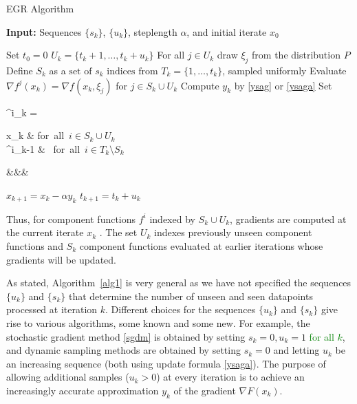 \documentclass[11pt]{article}
\begin{document}
\begin{algorithm}
	[H] 
	\caption{EGR Algorithm}
	\label{alg1}
	{\bf Input:} Sequences $\{ s_k\}$, $\{ u_k \}$, steplength $ \alpha $, and initial iterate $x_0$
	\begin{algorithmic}
		[1] 
		\State Set $t_{0} = 0$
		\State $U_k =\{t_{k}+1,\ldots, t_{k}+u_k \}$ 
		\State For  all $j \in U_k$ draw $\xi_j$ from the distribution $P$ 
		\State Define $S_k$ as a $ \mbox{set of } s_k \mbox{ indices from } T_k= \{ 1, \ldots ,t_{k}\}$, sampled uniformly
           \State Evaluate $\nabla f^j(x_k) = \nabla f(x_k, \xi_j) $ for $j \in S_k \cup U_k$
           \State Compute $y_k$ by \eqref{ysag} or \eqref{ysaga}
		\State Set \begin{flalign}  \label{chico} \qquad\quad \phi^i_k =
		\begin{cases} 
  x_k & \mbox{for all $i \in S_k\cup U_k$ } \\
  \phi^i_{k-1} & {\color{blue} \mbox{ for all $i \in T_k\setminus S_k$}}
 \end{cases}&&&
\end{flalign}
		\State $x_{k+1} = x_k - \alpha y_k$ 
		\State $ t_{k+1} = t_{k} +u_k $ 
		\EndLoop 
	\end{algorithmic}
\end{algorithm}

{\color{blue} Thus, for  component functions $f^i$ indexed by $S_k \cup U_k$,  gradients are computed at the current iterate $x_k$ . The set $U_k$ indexes previously unseen component functions and $S_k$  component functions evaluated at earlier iterations whose gradients will be updated.}

As stated, Algorithm~\ref{alg1} is very general as we have not specified the sequences $\{ u_k \}$ and $\{ s_k \}$ that determine the number of unseen and seen datapoints processed at iteration $k$. Different choices for the sequences $\{ u_k \}$ and $\{ s_k \}$ give rise to various algorithms, some known and some new. For example, the stochastic gradient method \eqref{sgdm} is obtained by setting $s_k=0, u_k =1$ \textcolor{green}{for all $k$}, and dynamic sampling methods are obtained by setting $s_k=0$ and letting $u_k$ be an increasing sequence (both using update formula \eqref{ysaga}). The purpose of allowing additional samples ($u_k >0$) at every iteration is to achieve an increasingly accurate approximation $y_k$ of the gradient $\nabla F(x_k)$. 
\end{document}
